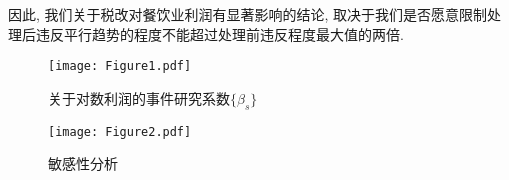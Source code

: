 \documentclass[cn,sakura,14pt,screen,bibstyle=gb7714-2015,math=mtpro2]{elegantnote}
\begin{document}
因此, 我们关于税改对餐饮业利润有显著影响的结论, 取决于我们是否愿意限制处理后违反平行趋势的程度不能超过处理前违反程度最大值的两倍.


\begin{figure}[htbp!]
  \centering
  \texttt{[image: Figure1.pdf]}
  \caption{关于对数利润的事件研究系数$\{\beta_s\}$}
\end{figure}

\begin{figure}[htbp!]
  \centering
  \texttt{[image: Figure2.pdf]}
  \caption{敏感性分析}
\end{figure}

\newpage

\nocite{Andrews2023inference}
\nocite{benzarti2019really}
\nocite{callaway2021difference}
\nocite{goodman2021difference}
\nocite{rambachan2023more}
\nocite{roth2022pretest}
\nocite{roth2023s}
\nocite{sun2021estimating}
\nocite{Zhang2023}
\printbibliography[heading=bibintoc, title=\ebibname]
\end{document}
